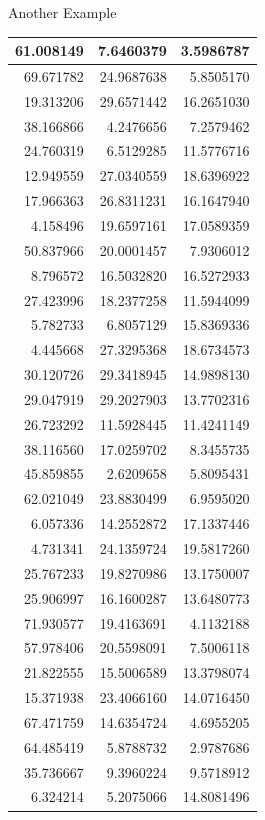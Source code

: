 \documentclass[
  ignorenonframetext,
]{beamer}
\begin{document}
\begin{frame}{Another Example}
\begin{table}
\begin{tabular}[t]{r|r|r}
\hline
61.008149 & 7.6460379 & 3.5986787\\
\hline
69.671782 & 24.9687638 & 5.8505170\\
\hline
19.313206 & 29.6571442 & 16.2651030\\
\hline
38.166866 & 4.2476656 & 7.2579462\\
\hline
24.760319 & 6.5129285 & 11.5776716\\
\hline
12.949559 & 27.0340559 & 18.6396922\\
\hline
17.966363 & 26.8311231 & 16.1647940\\
\hline
4.158496 & 19.6597161 & 17.0589359\\
\hline
50.837966 & 20.0001457 & 7.9306012\\
\hline
8.796572 & 16.5032820 & 16.5272933\\
\hline
27.423996 & 18.2377258 & 11.5944099\\
\hline
5.782733 & 6.8057129 & 15.8369336\\
\hline
4.445668 & 27.3295368 & 18.6734573\\
\hline
30.120726 & 29.3418945 & 14.9898130\\
\hline
29.047919 & 29.2027903 & 13.7702316\\
\hline
26.723292 & 11.5928445 & 11.4241149\\
\hline
38.116560 & 17.0259702 & 8.3455735\\
\hline
45.859855 & 2.6209658 & 5.8095431\\
\hline
62.021049 & 23.8830499 & 6.9595020\\
\hline
6.057336 & 14.2552872 & 17.1337446\\
\hline
4.731341 & 24.1359724 & 19.5817260\\
\hline
25.767233 & 19.8270986 & 13.1750007\\
\hline
25.906997 & 16.1600287 & 13.6480773\\
\hline
71.930577 & 19.4163691 & 4.1132188\\
\hline
57.978406 & 20.5598091 & 7.5006118\\
\hline
21.822555 & 15.5006589 & 13.3798074\\
\hline
15.371938 & 23.4066160 & 14.0716450\\
\hline
67.471759 & 14.6354724 & 4.6955205\\
\hline
64.485419 & 5.8788732 & 2.9787686\\
\hline
35.736667 & 9.3960224 & 9.5718912\\
\hline
6.324214 & 5.2075066 & 14.8081496\\

\end{tabular}
\end{table}
\end{frame}
\end{document}
